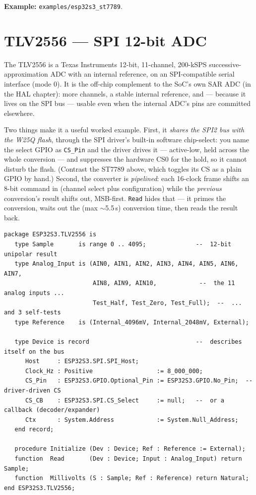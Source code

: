 \noindent\textbf{Example:} \texttt{examples/esp32s3\_st7789}.

\section{TLV2556 --- SPI 12-bit ADC}
\label{app:ext:tlv2556}

The TLV2556 is a Texas Instruments 12-bit, 11-channel, 200-kSPS
successive-approximation ADC with an internal reference, on an SPI-compatible
serial interface (mode 0). It is the off-chip complement to the SoC's own SAR ADC
(in the HAL chapter): more channels, a stable internal reference, and --- because
it lives on the SPI bus --- usable even when the internal ADC's pins are committed
elsewhere.

Two things make it a useful worked example. First, it \emph{shares the SPI2 bus
with the W25Q flash}, through the SPI driver's built-in software chip-select: you
name the select GPIO as \texttt{CS\_Pin} and the driver drives it --- active-low,
held across the whole conversion --- and suppresses the hardware CS0 for the hold,
so it cannot disturb the flash. (Contrast the ST7789 above, which toggles its CS
as a plain GPIO by hand.) Second, the converter is \emph{pipelined}: each 16-clock
frame shifts an 8-bit command in (channel select plus configuration) while the
\emph{previous} conversion's result shifts out, MSB-first. \texttt{Read} hides
that --- it primes the conversion, waits out the (max $\sim$5.5\,\textmu s)
conversion time, then reads the result back.

\begin{lstlisting}
package ESP32S3.TLV2556 is
   type Sample       is range 0 .. 4095;              --  12-bit unipolar result
   type Analog_Input is (AIN0, AIN1, AIN2, AIN3, AIN4, AIN5, AIN6, AIN7,
                         AIN8, AIN9, AIN10,            --  the 11 analog inputs ...
                         Test_Half, Test_Zero, Test_Full);  --  ... and 3 self-tests
   type Reference    is (Internal_4096mV, Internal_2048mV, External);

   type Device is record                              --  describes itself on the bus
      Host     : ESP32S3.SPI.SPI_Host;
      Clock_Hz : Positive                  := 8_000_000;
      CS_Pin   : ESP32S3.GPIO.Optional_Pin := ESP32S3.GPIO.No_Pin;  -- driver-driven CS
      CS_CB    : ESP32S3.SPI.CS_Select     := null;   --  or a callback (decoder/expander)
      Ctx      : System.Address            := System.Null_Address;
   end record;

   procedure Initialize (Dev : Device; Ref : Reference := External);
   function  Read       (Dev : Device; Input : Analog_Input) return Sample;
   function  Millivolts (S : Sample; Ref : Reference) return Natural;
end ESP32S3.TLV2556;
\end{lstlisting}


